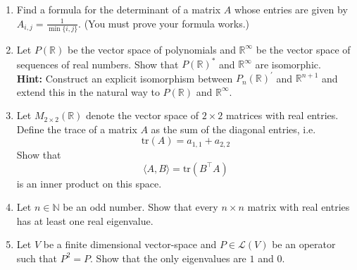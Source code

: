 \documentclass[12pt,letterpaper]{article}
\newcommand{\tr}{\text{tr}}
\theoremstyle{plain}
\theoremstyle{definition}
\begin{document}
\begin{enumerate}[{\bf1.}]

\item Find a formula for the determinant of a matrix $A$ whose entries are given by $A_{i,j}=\frac{1}{\min\{i,j\}}$. (You must prove your formula works.)

\item Let $P(\mathbb{R})$ be the vector space of polynomials and $\mathbb{R}^\infty$ be the vector space of sequences of real numbers. Show that $P(\mathbb{R})^*$ and $\mathbb{R}^\infty$ are isomorphic. \vspace{-.1in}\\

{\bf Hint: }Construct an explicit isomorphism between $P_n(\mathbb{R})^\prime$ and $\mathbb{R}^{n+1}$ and extend this in the natural way to $P(\mathbb{R})$ and $\mathbb{R}^\infty$. 

\item Let $M_{2\times 2}(\mathbb{R})$ denote the vector space of $2\times 2$ matrices with real entries.  Define the trace of a matrix $A$  as the sum of the diagonal entries, i.e. 
\[\tr(A)=a_{1,1}+a_{2,2}\]
Show that 
\[\langle A, B\rangle=\tr(B^\top A)\]
is an inner product on this space. 

\item Let $n\in \mathbb{N}$ be an odd number. Show that every $n\times n$ matrix with real entries has at least one real eigenvalue. \\

\item Let $V$ be a finite dimensional vector-space and $P\in \mathcal{L}(V)$ be an operator such that $P^2=P$. Show that the only eigenvalues are $1$ and $0$. 


\end{enumerate}
\end{document}
